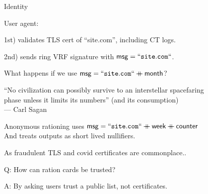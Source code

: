 \documentclass{beamer}
\begin{document}
\begin{frame}{Identity}

User agent: \\ \medskip

1st) validates TLS cert of ``site.com'', including CT logs. \\ \medskip

2nd) sends ring VRF signature with $\mathsf{msg} = \mathtt{``site.com``}$. \\ \medskip

\pause\bigskip\bigskip 

What happens if we use $\mathsf{msg} = \mathtt{``site.com``} \mathbin{+\mkern-10mu+} \mathsf{month}$?

\end{frame}



\begin{frame}

``No civilization can possibly survive to an interstellar spacefaring \\ \smallskip
\hspace{1pt} phase unless it limits its numbers'' (and its consumption) \\ \medskip
\hspace{1pt} --- Carl Sagan

\pause\bigskip\bigskip 

Anonymous rationing uses $\mathsf{msg} = \mathtt{``site.com``} \mathbin{+\mkern-10mu+} \mathsf{week} \mathbin{+\mkern-10mu+} \mathsf{counter}$ \\
\hspace{1pt} And treats outputs as short lived nullifiers.

\end{frame}



\begin{frame}

As fraudulent TLS and covid certificates are commonplace..

\bigskip

Q: How can ration cards be trusted? \\ 

\bigskip 

A: By asking users trust a public list, not certificates.


\end{frame}
\end{document}
